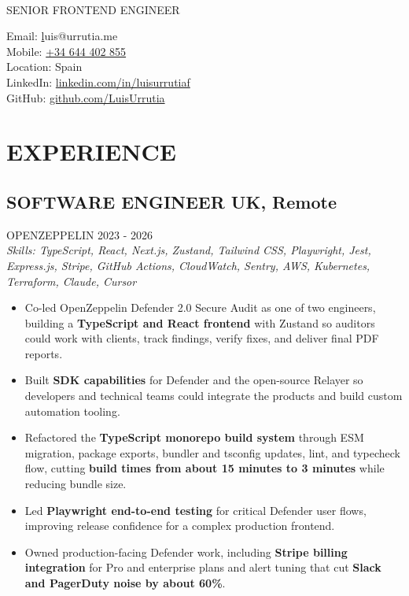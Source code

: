 \documentclass{article}
\newcommand{\WorkExperience}[2]{
   \subsection*{#1}
   \vspace{-1em}
   \uppercase{#2}
}
\newcommand{\Skills}[1]{
   \textit{Skills: #1}
}
\begin{document}
\begin{center}
	\begin{minipage}{0.5\textwidth}
		{\fontsize{24}{28}\Title{}} \\
		\bigskip
		{\normalsize \MakeUppercase{Senior Frontend Engineer}}
	\end{minipage} \hfill
	\begin{minipage}{0.4\textwidth}
		\raggedleft{}
		Email: \href{mailto:luis@urrutia.me}luis@urrutia.me \\
		Mobile: \href{tel:+34644402855}{+34 644 402 855}  \\
		Location: Spain \\
		LinkedIn: \href{https://linkedin.com/in/luisurrutiaf}{linkedin.com/in/luisurrutiaf} \\
		GitHub: \href{https://github.com/LuisUrrutia}{github.com/LuisUrrutia}
	\end{minipage}
\end{center}

\vspace{-3em}

\phantom{Amazon, Microsoft, Facebook} %

\section*{EXPERIENCE}
\WorkExperience{SOFTWARE ENGINEER \hfill UK, Remote}{OpenZeppelin \hfill 2023 {-} 2026} \\
\Skills{TypeScript, React, Next.js, Zustand, Tailwind CSS, Playwright, Jest, Express.js, Stripe, GitHub Actions, CloudWatch, Sentry, AWS, Kubernetes, Terraform, Claude, Cursor}
\begin{itemize}
	\item Co-led OpenZeppelin Defender 2.0 Secure Audit as one of two engineers, building a \textbf{TypeScript and React frontend} with Zustand so auditors could work with clients, track findings, verify fixes, and deliver final PDF reports.
	\item Built \textbf{SDK capabilities} for Defender and the open-source Relayer so developers and technical teams could integrate the products and build custom automation tooling.
	\item Refactored the \textbf{TypeScript monorepo build system} through ESM migration, package exports, bundler and tsconfig updates, lint, and typecheck flow, cutting \textbf{build times from about 15 minutes to 3 minutes} while reducing bundle size.
	\item Led \textbf{Playwright end-to-end testing} for critical Defender user flows, improving release confidence for a complex production frontend.
	\item Owned production-facing Defender work, including \textbf{Stripe billing integration} for Pro and enterprise plans and alert tuning that cut \textbf{Slack and PagerDuty noise by about 60\%}.
\end{itemize}
\end{document}
